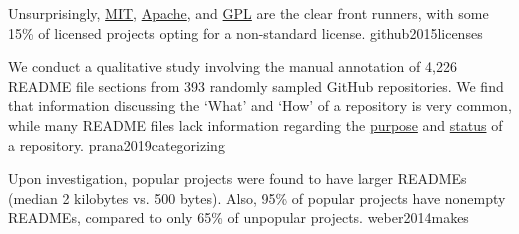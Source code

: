 \documentclass{article}
\begin{document}
  {Unsurprisingly, \ul{MIT}, \ul{Apache}, and \ul{GPL} are the clear front runners, with some 15\% of licensed projects opting for a non-standard license.}
  {github2015licenses}



  {We conduct a qualitative study involving the manual annotation of 4,226 README file sections from 393 randomly sampled GitHub repositories. We find that information discussing the `What' and `How' of a repository is very common, while many README files lack information regarding the \ul{purpose} and \ul{status} of a repository.}
  {prana2019categorizing}

  {Upon investigation, popular projects were found to have larger READMEs (median 2 kilobytes vs. 500 bytes). Also, 95\% of popular projects have nonempty READMEs, compared to only 65\% of unpopular projects.}
  {weber2014makes}
\end{document}
